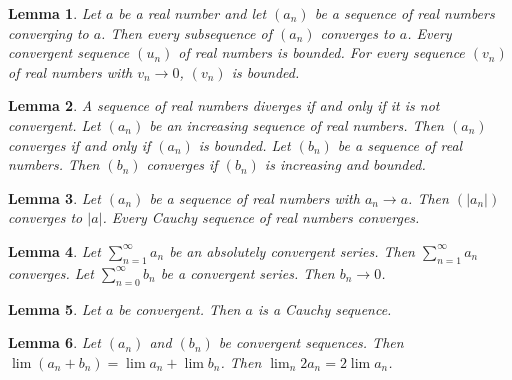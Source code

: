 \documentclass{article}
\newtheorem{lemma}{Lemma}
\begin{document}
\begin{lemma}\label{sequence-and-limit}
Let $a$ be a real number and let $(a_n)$ be a sequence of real numbers converging to $a$. Then every subsequence of $(a_n)$ converges to $a$. Every convergent sequence $(u_n)$ of real numbers is bounded. For every sequence $(v_n)$ of real numbers with $v_n\to0$, $(v_n)$ is bounded.
\end{lemma}

\begin{lemma}\label{converges-if}
A sequence of real numbers diverges if and only if it is not convergent. Let $(a_n)$ be an increasing sequence of real numbers. Then $(a_n)$ converges if and only if $(a_n)$ is bounded. Let $(b_n)$ be a sequence of real numbers. Then $(b_n)$ converges if $(b_n)$ is increasing and bounded.
\end{lemma}

\begin{lemma}\label{limit-letter}
Let $(a_n)$ be a sequence of real numbers with $a_n\to a$. Then $(|a_n|)$ converges to $|a|$. Every Cauchy sequence of real numbers converges.
\end{lemma}

\begin{lemma}\label{series-binders}
Let $\sum_{n=1}^\infty a_n$ be an absolutely convergent series. Then $\sum_{n=1}^\infty a_n$ converges. Let $\sum_{n=0}^\infty b_n$ be a convergent series. Then $b_n\to0$.
\end{lemma}

\begin{lemma}\label{sequence-without-noun}
Let $a$ be convergent. Then $a$ is a Cauchy sequence.
\end{lemma}

\begin{lemma}\label{limits-without-bounds}
Let $(a_n)$ and $(b_n)$ be convergent sequences. Then $\lim(a_n+b_n)=\lim a_n+\lim b_n$. Then $\lim_n 2a_n=2\lim a_n$.
\end{lemma}
\end{document}
